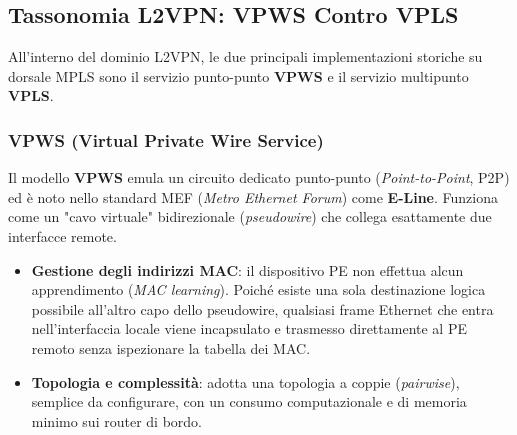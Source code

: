 \documentclass[11pt, a4paper]{article}
\begin{document}
\subsection{Tassonomia L2VPN: VPWS Contro VPLS}
All'interno del dominio L2VPN, le due principali implementazioni storiche su dorsale MPLS sono il servizio punto-punto \textbf{VPWS} e il servizio multipunto \textbf{VPLS}.

\subsubsection{VPWS (Virtual Private Wire Service)}
Il modello \textbf{VPWS} emula un circuito dedicato punto-punto (\emph{Point-to-Point}, P2P) ed è noto nello standard MEF (\emph{Metro Ethernet Forum}) come \textbf{E-Line}. Funziona come un "cavo virtuale" bidirezionale (\emph{pseudowire}) che collega esattamente due interfacce remote.
\begin{itemize}[noitemsep]
    \item \textbf{Gestione degli indirizzi MAC}: il dispositivo PE non effettua alcun apprendimento (\emph{MAC learning}). Poiché esiste una sola destinazione logica possibile all'altro capo dello pseudowire, qualsiasi frame Ethernet che entra nell'interfaccia locale viene incapsulato e trasmesso direttamente al PE remoto senza ispezionare la tabella dei MAC.
    \item \textbf{Topologia e complessità}: adotta una topologia a coppie (\emph{pairwise}), semplice da configurare, con un consumo computazionale e di memoria minimo sui router di bordo.
\end{itemize}
\end{document}
